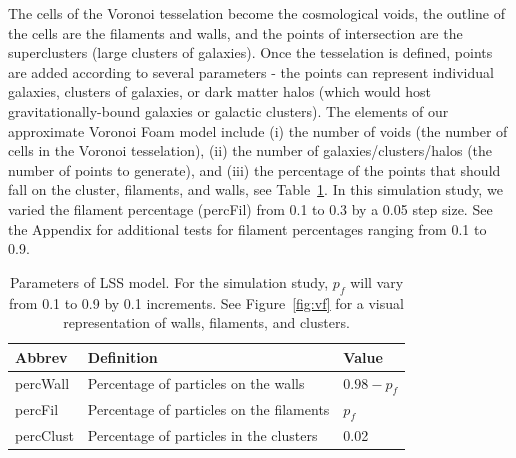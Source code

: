 \documentclass[12pt]{article}
\newcommand{\figref}[1]{Figure~\ref{#1}}
\begin{document}
The cells of the Voronoi tesselation become the cosmological voids, the outline of the cells are the filaments and walls, and the points of intersection are the superclusters (large clusters of galaxies).  Once the tesselation is defined, points are added according to several parameters - the points can represent individual galaxies, clusters of galaxies, or dark matter halos (which would host gravitationally-bound galaxies or galactic clusters).
The elements of our approximate Voronoi Foam model include (i) the number of voids (the number of cells in the Voronoi tesselation), (ii) the number of galaxies/clusters/halos (the number of points to generate), and (iii) the percentage of the points that should fall on the cluster, filaments, and walls, see Table~\ref{table:voronoisettings}. In this simulation study, we varied the filament percentage (percFil) from 0.1 to 0.3 by a 0.05 step size. See the Appendix for additional tests for filament percentages ranging from 0.1 to 0.9.

\begin{table}[htp!]
\begin{center}
\begin{tabular}{ l|l|l }
Abbrev & Definition & Value \\
\hline
percWall & Percentage of particles on the walls & $0.98 - p_{f}$ \\
percFil & Percentage of particles on the filaments & $p_{f}$ \\
percClust & Percentage of particles in the clusters & 0.02 \\
\end{tabular}
\end{center}
\caption{Parameters of LSS model. For the simulation study, $p_{f}$ will vary from 0.1 to 0.9 by 0.1 increments. See \figref{fig:vf} for a visual representation of walls, filaments, and clusters.}
\label{table:voronoisettings}
\end{table}
\end{document}
